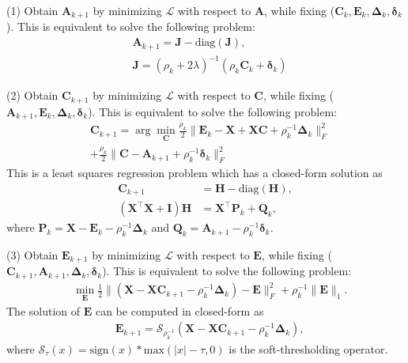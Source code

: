 \documentclass[10pt,twocolumn,letterpaper]{article}
\begin{document}
(1) Obtain $\bm{A}_{k+1}$ by minimizing $\mathcal{L}$ with respect to $\bm{A}$, while fixing ($\bm{C}_{k},\bm{E}_{k},\bm{\Delta}_{k},\bm{\delta}_{k}$). This is equivalent to solve the following problem:
\begin{equation}
\begin{split}
\label{e8}
&
\bm{A}_{k+1}
=
\bm{J}-\text{diag}(\bm{J}),
\\
&
\bm{J}
=
(\rho_{k}+2\lambda)^{-1}
(\rho_{k}\bm{C}_{k}+\bm{\delta}_{k})
\end{split}
\end{equation}

(2) Obtain $\bm{C}_{k+1}$ by minimizing $\mathcal{L}$ with respect to $\bm{C}$, while fixing ($\bm{A}_{k+1},\bm{E}_{k},\bm{\Delta}_{k},\bm{\delta}_{k}$). This is equivalent to solve the following problem:
\begin{equation}
\begin{split}
\label{e6}
&
\bm{C}_{k+1}
=
\arg\min_{\bm{C}}
\frac{\rho_{k}}{2}
\|
\bm{E}_{k}-\bm{X}+\bm{X}\bm{C}+\rho_{k}^{-1}\bm{\Delta}_{k}
\|_{F}^{2}
\\
&
+
\frac{\rho_{k}}{2}
\|
\bm{C}-\bm{A}_{k+1}+\rho_{k}^{-1}\bm{\delta}_{k}
\|_{F}^{2}
\end{split}
\end{equation}
This is a least squares regression problem which has a closed-form solution as 
\begin{equation}
\begin{split}
\label{e7}
\bm{C}_{k+1} 
&
=
\bm{H}-\text{diag}(\bm{H}),
\\
(\bm{X}^{\top}\bm{X}+\bm{I})\bm{H}
&
=
\bm{X}^{\top}\bm{P}_{k}+\bm{Q}_{k},
\end{split}
\end{equation}
where $\bm{P}_{k}=\bm{X}-\bm{E}_{k}-\rho_{k}^{-1}\bm{\Delta}_{k}$
and
$\bm{Q}_{k}=\bm{A}_{k+1}-\rho_{k}^{-1}\bm{\delta}_{k}$.

(3) Obtain $\bm{E}_{k+1}$ by minimizing $\mathcal{L}$ with respect to $\bm{E}$, while fixing ($\bm{C}_{k+1},\bm{A}_{k+1},\bm{\Delta}_{k},\bm{\delta}_{k}$). This is equivalent to solve the following problem:
\begin{equation}
\begin{split}
\label{e9}
&
\min_{\bm{E}}
\frac{1}{2}
\|
(\bm{X}-\bm{X}\bm{C}_{k+1}-\rho_{k}^{-1}\bm{\Delta}_{k})
-
\bm{E}
\|_{F}^{2}
+
\rho_{k}^{-1}
\|
\bm{E}
\|_{1}.
\end{split}
\end{equation}
The solution of $\bm{E}$ can be computed in closed-form as 
\begin{equation}
\begin{split}
\label{e10}
&
\bm{E}_{k+1}
=
\mathcal{S}_{\rho_{k}^{-1}}
(\bm{X}-\bm{X}\bm{C}_{k+1}-\rho_{k}^{-1}\bm{\Delta}_{k}),
\end{split}
\end{equation}
where $\mathcal{S}_{\tau}(x)=\text{sign}(x)*\text{max}(|x|-\tau,0)$ is the soft-thresholding operator.
\end{document}
